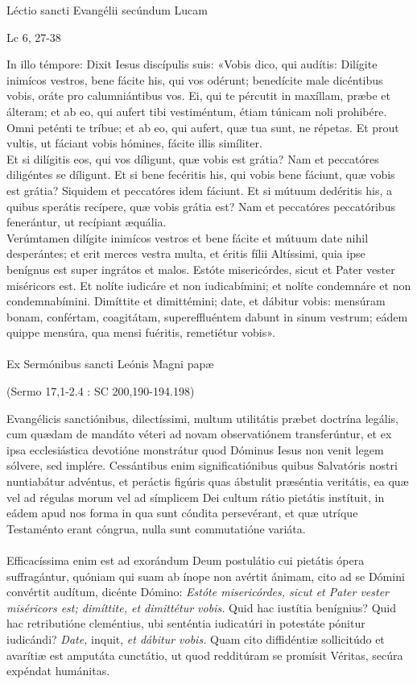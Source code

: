 \documentclass[options]{article}
\begin{document}
	Léctio sancti Evangélii secúndum Lucam 
	\begin{flushright}
				Lc 6, 27-38
	\end{flushright}
	In illo témpore: Dixit Iesus discípulis suis:
	«Vobis dico, qui audítis: Dilígite inimícos vestros, bene fácite his, qui vos odérunt; benedícite male dicéntibus vobis, oráte pro calumniántibus vos. Ei, qui te pércutit in maxíllam, præbe et álteram; et ab eo, qui aufert tibi vestiméntum, étiam túnicam noli prohibére. Omni peténti te tríbue; et ab eo, qui aufert, quæ tua sunt, ne répetas. Et prout vultis, ut fáciant vobis hómines, fácite illis simíliter.\\
	Et si dilígitis eos, qui vos díligunt, quæ vobis est grátia? Nam et peccatóres diligéntes se díligunt. Et si bene fecéritis his, qui vobis bene fáciunt, quæ vobis est grátia? Siquidem et peccatóres idem fáciunt. Et si mútuum dedéritis his, a quibus sperátis recípere, quæ vobis grátia est? Nam et peccatóres peccatóribus fenerántur, ut recípiant æquália.\\
	Verúmtamen dilígite inimícos vestros et bene fácite et mútuum date nihil desperántes; et erit merces vestra multa, et éritis fílii Altíssimi, quia ipse benígnus est super ingrátos et malos. Estóte misericórdes, sicut et Pater vester miséricors est.
	Et nolíte iudicáre et non iudicabímini; et nolíte condemnáre et non condemnabímini. Dimíttite et dimittémini; date, et dábitur vobis: mensúram bonam, confértam, coagitátam, supereffluéntem dabunt in sinum vestrum; eádem quippe mensúra, qua mensi fuéritis, remetiétur vobis».\\
	\\
	Ex Sermónibus sancti Leónis Magni papæ
	\begin{flushright}
		(Sermo 17,1-2.4 : SC 200,190-194.198)
	\end{flushright}
	Evangélicis sanctiónibus, dilectíssimi, multum utilitátis præbet doctrína legális, cum quædam de mandáto véteri ad novam observatiónem transferúntur, et ex ipsa ecclesiástica devotióne monstrátur quod Dóminus Iesus non venit legem sólvere, sed implére. {\color{gray} Cessántibus enim significatiónibus quibus Salvatóris nostri nuntiabátur advéntus, et peráctis figúris quas ábstulit præséntia veritátis, ea quæ vel ad régulas morum vel ad símplicem Dei cultum rátio pietátis instítuit, in eádem apud nos forma in qua sunt cóndita persevérant, et quæ utríque Testaménto erant cóngrua, nulla sunt commutatióne variáta.} \\
	\\
	Efficacíssima enim est ad exorándum Deum postulátio cui pietátis ópera suffragántur, quóniam qui suam ab ínope non avértit ánimam, cito ad se Dómini convértit audítum, dicénte Dómino: \emph{Estóte misericórdes, sicut et Pater vester miséricors est; dimíttite, et dimittétur vobis.} Quid hac iustítia benígnius? Quid hac retributióne cleméntius, ubi senténtia iudicatúri in potestáte pónitur iudicándi? \emph{Date,} inquit, \emph{et dábitur vobis.} Quam cito diffidéntiæ sollicitúdo et avarítiæ est amputáta cunctátio, ut quod redditúram se promísit Véritas, secúra expéndat humánitas.\\
\end{document}
